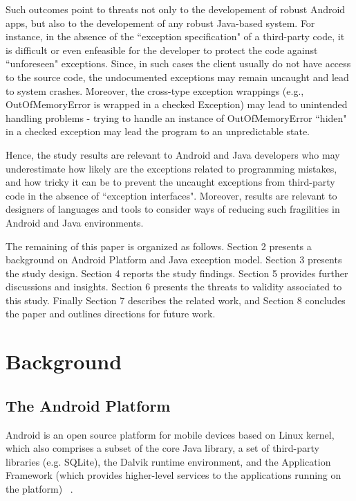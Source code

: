 \documentclass[conference]{IEEEtran}
\begin{document}
Such outcomes point to threats not only to the developement of robust Android apps, 
but also to the developement of any robust Java-based system. For instance, in the absence of the 
``exception specification" of  a third-party code, it is difficult or 
even enfeasible for the developer to protect the code against ``unforeseen" exceptions. 
Since, in such cases the client usually do not have access to the source code, the undocumented exceptions may 
remain uncaught and lead to system crashes. Moreover, the cross-type exception wrappings 
(e.g., OutOfMemoryError is wrapped in a checked Exception) 
may lead to unintended handling problems - trying to handle an instance of OutOfMemoryError ``hiden" in 
a checked exception may lead the program to an unpredictable state.

Hence, the study results are relevant to Android and 
Java developers who may underestimate how likely are the
 exceptions related to programming mistakes, and how 
 tricky it can be to prevent the uncaught exceptions from third-party code
 in the absence of ``exception interfaces". Moreover, results are relevant to 
designers of languages and tools to consider ways of reducing such fragilities 
in Android and Java environments.

The remaining of this paper is organized as follows. Section 2 presents a
background on Android Platform and Java exception model. 
Section 3 presents the study design. Section 4 reports the study findings. 
Section 5 provides further discussions and insights.
Section 6 presents the threats to validity associated to this study. Finally Section
7 describes the related work, and Section 8 concludes the paper and outlines
directions for future work.

\section{Background}
\label{sec:back}

\subsection{The Android Platform} \label{sec:extypes}
Android is an open source platform for mobile devices based on Linux kernel,
which also comprises a subset of the core Java library, a set of third-party libraries (e.g.  SQLite),
the Dalvik runtime environment, and the Application Framework (which provides 
higher-level services to the applications running on the platform) ~\cite{andguide}.
\end{document}
